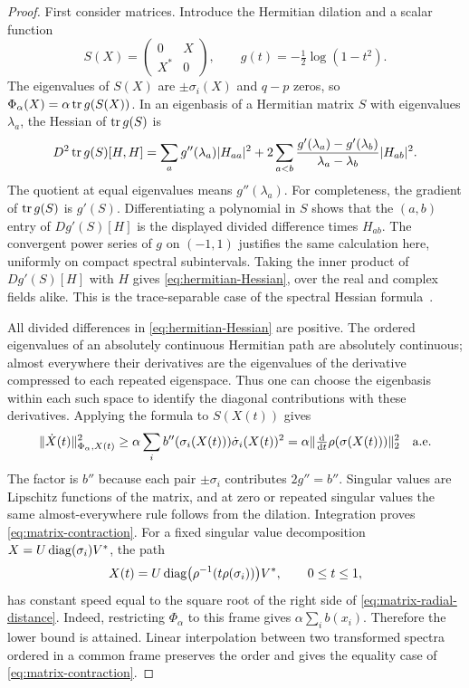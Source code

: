 \begin{proof}
First consider matrices. Introduce the Hermitian dilation and a scalar
function
\[
 S(X)=\begin{pmatrix}0&X\\X^*&0\end{pmatrix},\qquad
 g(t)=-\tfrac12\log(1-t^2).
\]
The eigenvalues of $S(X)$ are $\pm\sigma_i(X)$ and $q-p$ zeros, so
$\Phi_\alpha(X)=\alpha\operatorname{tr} g(S(X))$. In an eigenbasis of a Hermitian
matrix $S$ with eigenvalues $\lambda_a$, the Hessian of $\operatorname{tr} g(S)$ is
\begin{equation}
 D^2\operatorname{tr} g(S)[H,H]
 =\sum_a g''(\lambda_a)|H_{aa}|^2
 +2\sum_{a<b}\frac{g'(\lambda_a)-g'(\lambda_b)}{\lambda_a-\lambda_b}
       |H_{ab}|^2.
 \label{eq:hermitian-Hessian}
\end{equation}
The quotient at equal eigenvalues means $g''(\lambda_a)$.
For completeness, the gradient of $\operatorname{tr} g(S)$ is $g'(S)$.
Differentiating a polynomial in $S$ shows that the $(a,b)$ entry of
$Dg'(S)[H]$ is the displayed divided difference times $H_{ab}$.
The convergent power series of $g$ on $(-1,1)$ justifies the same
calculation here, uniformly on compact spectral subintervals.
Taking the inner product of $Dg'(S)[H]$ with $H$ gives
\eqref{eq:hermitian-Hessian}, over the real and complex fields alike.
This is the trace-separable case of the spectral Hessian
formula~\cite{LewisSendov2001}.

All divided differences in \eqref{eq:hermitian-Hessian} are positive.
The ordered eigenvalues of an absolutely continuous Hermitian path are
absolutely continuous; almost everywhere their derivatives are the
eigenvalues of the derivative compressed to each repeated eigenspace.
Thus one can choose the eigenbasis within each such space to identify
the diagonal contributions with these derivatives. Applying the formula
to $S(X(t))$ gives
\begin{equation}
 \lVert \dot X(t)\rVert_{\Phi_\alpha,X(t)}^2
 \geq\alpha\sum_i b''(\sigma_i(X(t)))\dot\sigma_i(X(t))^2
 =\alpha\lVert \tfrac{\mathrm d}{\mathrm dt}\rho(\sigma(X(t)))\rVert_2^2
 \quad\text{a.e.}
 \label{eq:singular-speed-contraction}
\end{equation}
The factor is $b''$ because each pair $\pm\sigma_i$ contributes
$2g''=b''$.
Singular values are Lipschitz functions of the matrix, and at zero or
repeated singular values the same almost-everywhere rule follows from
the dilation. Integration proves \eqref{eq:matrix-contraction}.
For a fixed singular value decomposition $X=U\operatorname{diag}(\sigma_i)V^*$,
the path
\begin{equation}
 X(t)=U\operatorname{diag}\bigl(\rho^{-1}(t\rho(\sigma_i))\bigr)V^*,
 \qquad 0\leq t\leq1,
 \label{eq:radial-geodesic}
\end{equation}
has constant speed equal to the square root of the right side of
\eqref{eq:matrix-radial-distance}.
Indeed, restricting $\Phi_\alpha$ to this frame gives
$\alpha\sum_i b(x_i)$. Therefore the lower bound is attained.
Linear interpolation between two transformed spectra ordered in a
common frame preserves the order and gives the equality case of
\eqref{eq:matrix-contraction}.


\end{proof}
